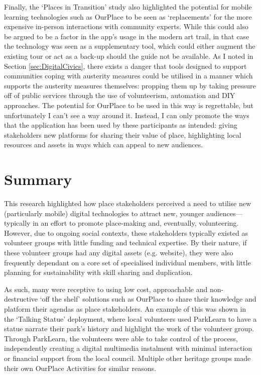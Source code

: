 Finally, the `Places in Transition' study also highlighted the potential for mobile learning technologies such as OurPlace to be seen as `replacements' for the more expensive in-person interactions with community experts. While this could also be argued to be a factor in the app's usage in the modern art trail, in that case the technology was seen as a supplementary tool, which could either augment the existing tour or act as a back-up should the guide not be available. As I noted in Section \ref{sec:DigitalCivics}, there exists a danger that tools designed to support communities coping with austerity measures could be utilised in a manner which supports the austerity measures themselves: propping them up by taking pressure off of public services through the use of volunteerism, automation and DIY approaches. The potential for OurPlace to be used in this way is regrettable, but unfortunately I can't see a way around it. Instead, I can only promote the ways that the application has been used by these participants as intended: giving stakeholders new platforms for sharing their value of place, highlighting local resources and assets in ways which can appeal to new audiences.

\section{Summary}
This research highlighted how place stakeholders perceived a need to utilise new (particularly mobile) digital technologies to attract new, younger audiences---typically in an effort to promote place-making and, eventually, volunteering. However, due to ongoing social contexts, these stakeholders typically existed as volunteer groups with little funding and technical expertise. By their nature, if these volunteer groups had any digital assets (e.g. website), they were also frequently dependant on a core set of specialised individual members, with little planning for sustainability with skill sharing and duplication.

As such, many were receptive to using low cost, approachable and non-destructive `off the shelf' solutions such as OurPlace to share their knowledge and platform their agendas as place stakeholders. An example of this was shown in the `Talking Statue' deployment, where local volunteers used ParkLearn to have a statue narrate their park's history and highlight the work of the volunteer group. Through ParkLearn, the volunteers were able to take control of the process, independently creating a digital multimedia instalment with minimal interaction or financial support from the local council. Multiple other heritage groups made their own OurPlace Activities for similar reasons.

